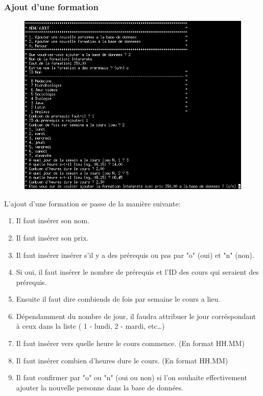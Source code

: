 \documentclass[11pt]{article}
\begin{document}
\subsubsection{Ajout d'une formation}
\begin{figure}[ht]
  \centering
  \includegraphics[width=\textwidth]{images/11.png}
\end{figure}
L'ajout d'une formation se passe de la manière suivante:
\begin{enumerate}
\item Il faut insérer son nom.
\item Il faut insérer son prix.
\item Il faut insérer insérer s'il y a des prérequis ou pas par "o" (oui) et "n" (non).
\item Si oui, il faut insérer le nombre de prérequis et l'ID des cours qui seraient des prérequis.
\item Ensuite il faut dire combiends de fois par semaine le cours a lieu.
\item Dépendamment du nombre de jour, il faudra attribuer le jour corréspondant à ceux dans la liste ( 1 - lundi, 2 - mardi, etc\ldots)
\item Il faut insérer vers quelle heure le cours commence. (En format HH.MM)
\item Il faut insérer combien d'heures dure le cours. (En format HH.MM)
\item Il faut confirmer par "o" ou "n" (oui ou non) si l'on souhaite effectivement ajouter la nouvelle personne dans la base de données.
\end{enumerate}
\end{document}

